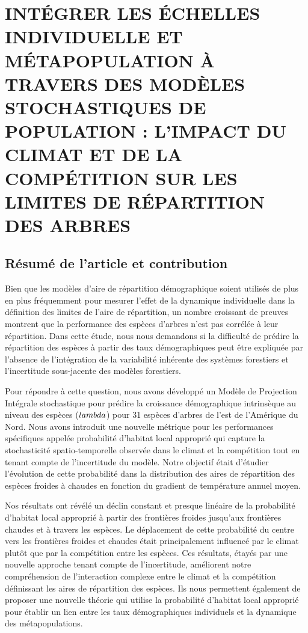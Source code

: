 \graphicspath{{chapter3/}{manuscript/}}

\chapter{\textbf{\MakeUppercase{  Intégrer les échelles individuelle et
métapopulation à travers des modèles stochastiques de population :
l'impact du climat et de la compétition sur les limites de répartition
des arbres}}}

\section{Résumé de l'article et contribution}

Bien que les modèles d'aire de répartition démographique soient utilisés
de plus en plus fréquemment pour mesurer l'effet de la dynamique
individuelle dans la définition des limites de l'aire de répartition, un
nombre croissant de preuves montrent que la performance des espèces
d'arbres n'est pas corrélée à leur répartition. Dans cette étude, nous
nous demandons si la difficulté de prédire la répartition des espèces à
partir des taux démographiques peut être expliquée par l'absence de
l'intégration de la variabilité inhérente des systèmes forestiers et
l'incertitude sous-jacente des modèles forestiers.

Pour répondre à cette question, nous avons développé un Modèle de
Projection Intégrale stochastique pour prédire la croissance
démographique intrinsèque au niveau des espèces (\(\\lambda\)) pour 31
espèces d'arbres de l'est de l'Amérique du Nord. Nous avons introduit
une nouvelle métrique pour les performances spécifiques appelée
probabilité d'habitat local approprié qui capture la stochasticité
spatio-temporelle observée dans le climat et la compétition tout en
tenant compte de l'incertitude du modèle. Notre objectif était d'étudier
l'évolution de cette probabilité dans la distribution des aires de
répartition des espèces froides à chaudes en fonction du gradient de
température annuel moyen.

Nos résultats ont révélé un déclin constant et presque linéaire de la
probabilité d'habitat local approprié à partir des frontières froides
jusqu'aux frontières chaudes et à travers les espèces. Le déplacement de
cette probabilité du centre vers les frontières froides et chaudes était
principalement influencé par le climat plutôt que par la compétition
entre les espèces. Ces résultats, étayés par une nouvelle approche
tenant compte de l'incertitude, améliorent notre compréhension de
l'interaction complexe entre le climat et la compétition définissant les
aires de répartition des espèces. Ils nous permettent également de
proposer une nouvelle théorie qui utilise la probabilité d'habitat local
approprié pour établir un lien entre les taux démographiques individuels
et la dynamique des métapopulations.

